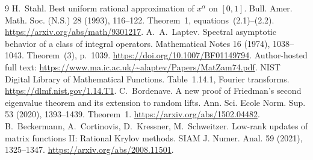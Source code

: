 \documentclass[11pt]{article}
\begin{document}
\begin{thebibliography}{9}
 H.~Stahl. Best uniform rational approximation of
$x^\alpha$ on $[0,1]$. Bull. Amer. Math. Soc. (N.S.) 28 (1993), 116--122.
Theorem~1, equations~(2.1)--(2.2).
\url{https://arxiv.org/abs/math/9301217}.
 A.~A.~Laptev. Spectral asymptotic behavior of a class of
integral operators. Mathematical Notes 16 (1974), 1038--1043.
Theorem~(3), p.~1039. \url{https://doi.org/10.1007/BF01149794}.
Author-hosted full text:
\url{https://www.ma.ic.ac.uk/~alaptev/Papers/MatZam74.pdf}.
 NIST Digital Library of Mathematical Functions.
Table~1.14.1, Fourier transforms.
\url{https://dlmf.nist.gov/1.14.T1}.
 C.~Bordenave. A new proof of Friedman's second
eigenvalue theorem and its extension to random lifts.
Ann. Sci. Ecole Norm. Sup. 53 (2020), 1393--1439. Theorem~1.
\url{https://arxiv.org/abs/1502.04482}.
 B.~Beckermann, A.~Cortinovis, D.~Kressner,
M.~Schweitzer. Low-rank updates of matrix functions II: Rational Krylov
methods. SIAM J. Numer. Anal. 59 (2021), 1325--1347.
\url{https://arxiv.org/abs/2008.11501}.
\end{thebibliography}
\end{document}
